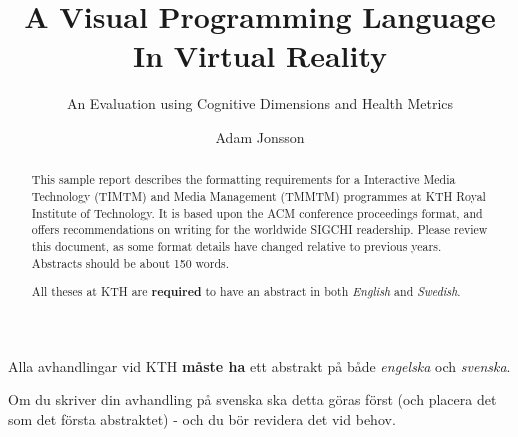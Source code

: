 \documentclass[screen, sigcconf]{timtm}
\newcommand{\alttitle}[1]{}
\newcommand{\altsubtitle}[1]{}
\newenvironment{swedishabstract}{}{}
\begin{document}
\title{A Visual Programming Language In Virtual Reality}
\subtitle{An Evaluation using Cognitive Dimensions and Health Metrics}

\alttitle{Detta är den svenska översättningen av titeln}
\altsubtitle{Detta är den svenska översättningen av undertiteln}

\author{Adam Jonsson} 

\begin{abstract}
  This sample report describes the formatting
  requirements for a Interactive Media Technology (TIMTM) and Media Management (TMMTM) programmes at KTH Royal Institute of Technology. It is based upon the ACM conference proceedings format, and offers
  recommendations on writing for the worldwide SIGCHI
  readership. Please review this document, as some format details have changed
  relative to previous years. Abstracts should be about 150 words.
  
  All theses at KTH are \textbf{required} to have an abstract in both \textit{English} and \textit{Swedish}.
\end{abstract}

\begin{swedishabstract}
Alla avhandlingar vid KTH \textbf{måste ha} ett abstrakt på både \textit{engelska} och \textit{svenska}.

Om du skriver din avhandling på svenska ska detta göras först (och placera det som det första abstraktet) - och du bör revidera det vid behov.
\end{swedishabstract}
\end{document}
